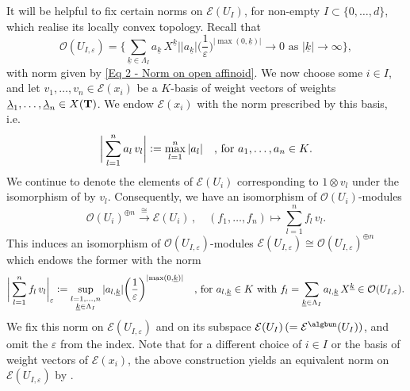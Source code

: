 \documentclass[a4paper, reqno, 10pt]{amsart}
\theoremstyle{definition}
\numberwithin{equation}{section}
\newcommand{\abs}[1]{{\lvert{#1}\rvert}}
\newcommand{\defeq}{\vcentcolon=}
\newcommand{\lra}{\longrightarrow}
\newcommand{\lto}{\longmapsto}
\newcommand{\ra}{\rightarrow}
\newcommand{\ul}[1]{{\underline{#1}}}
\newcommand{\CE}{{\mathcal {E}}}
\newcommand{\CO}{{\mathcal {O}}}
\newcommand{\bT}{{\mathrm{\bf T}}}
\begin{document}
It will be helpful to fix certain norms on $\CE(U_I)$, for non-empty $I \subset \{0,\ldots,d\}$, which realise its locally convex topology.
Recall that
\begin{equation*}
	\CO(U_{I,\varepsilon}) = \Bigg\{ \sum_{\ul{k}\in \Lambda_I} a_\ul{k} \, X^\ul{k} \Bigg\vert \abs{a_\ul{k}} \bigg(\frac{1}{\varepsilon}\bigg)^{\abs{ \max(0,\ul{k})}} \ra 0 \text{ as $\abs{\ul{k}} \ra \infty$} \Bigg\} ,
\end{equation*}
with norm given by \eqref{Eq 2 - Norm on open affinoid}.
We now choose some $i\in I$, and let $v_1,\ldots,v_n \in \CE(x_i)$ be a $K$-basis of weight vectors of weights $\ul{\lambda}_1,\ldots,\ul{\lambda}_n \in X(\bT)$.
We endow $\CE(x_i)$ with the norm prescribed by this basis, i.e.\ 
\begin{equation*}
	\bigg\lvert \sum_{l=1}^n a_l \, v_l \bigg\rvert \defeq \max_{l=1}^n \abs{a_l} \quad\text{, for $a_1,\ldots,a_n \in K$.}
\end{equation*}
We continue to denote the elements of $\CE(U_i)$ corresponding to $1 \otimes v_l$ under the isomorphism of  by $v_l$.
Consequently, we have an isomorphism of $\CO(U_i)$-modules
\begin{equation*}
	\CO(U_i)^{\oplus n} \overset{\cong}{\lra} \CE(U_i)\,,\quad (f_1,\ldots,f_n) \lto \sum_{l=1}^n f_l \, v_l .
\end{equation*}
This induces an isomorphism of $\CO(U_{I,\varepsilon})$-modules $\CE(U_{I,\varepsilon})\cong \CO(U_{I,\varepsilon})^{\oplus n}$ which endows the former with the norm
\begin{equation}\label{Eq 2 - Fixed norm on sections}
	\bigg\lvert \sum_{l=1}^n f_l \, v_l \bigg\lvert_\varepsilon \defeq \sup_{\substack{l=1,\ldots,n\\ \ul{k}\in \Lambda_I}} \abs{a_{l,\ul{k}}} \bigg( \frac{1}{\varepsilon}\bigg)^{\abs{ \max(0,\ul{k})}} \quad\text{, for $a_{l,\ul{k}}\in K$ with $f_l = \sum_{\ul{k}\in \Lambda_I} a_{l,\ul{k}} \, X^\ul{k} \in \CO(U_{I,\varepsilon})$.}
\end{equation}
We fix this norm on $\CE(U_{I,\varepsilon})$ and on its subspace $\CE(U_I) \, (=\CE^\algbun(U_I))$, and omit the $\varepsilon$ from the index.
Note that for a different choice of $i\in I$ or the basis of weight vectors of $\CE(x_i)$, the above construction yields an equivalent norm on $\CE(U_{I,\varepsilon})$ by \cite[3.7.3 Prop.\ 3]{BoschGuentzerRemmert84NonArchAna}.
\end{document}
